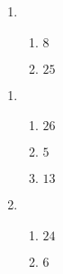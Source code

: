 \documentclass[12pt,twoside]{article}
\makeatletter
\def\emptycleardoublepage{\clearpage\if@twoside \ifodd\c@page\else
\thispagestyle{empty}%
\hbox{}\newpage\if@twocolumn\hbox{}\newpage\fi\fi\fi}
\makeatother
\begin{document}
\begin{multicols}{2}
\begin{enumerate}
\item \begin{enumerate}
\def \a{13}\def \dif{8}\def \b{5}
\item $\dif$
\def \a{8}\def \b{17}\def \apb{25}
\item $\apb$
\def \vshift{-5}\def \hshift{2}\def \chang{2}\def \findval{4}\def \yval{-9}
\end{enumerate}
\end{enumerate}\end{multicols}\emptycleardoublepage{}\graphicspath{{C:/Users/iainc/anaconda3/Randomizer/Sample Course/Sample Assessment 2/}}\begin{multicols}{2} \begin{enumerate}
\item \begin{enumerate}
\def \a{8}\def \b{18}\def \apb{26}
\item $\apb$
\def \a{13}\def \dif{5}\def \b{8}
\item $\dif$
\def \a{4}\def \b{9}\def \ab{13}
\item $\ab$
\def \vshift{-3}\def \hshift{2}\def \chang{1}\def \findval{3}\def \yval{-5}
\end{enumerate}

\item \begin{enumerate}
\def \a{9}\def \b{15}\def \apb{24}
\item $\apb$
\def \a{10}\def \dif{6}\def \b{4}
\item $\dif$
\def \vshift{-5}\def \hshift{-4}\def \chang{-2}\def \findval{-6}\def \yval{-1}
\end{enumerate}
\end{enumerate}\end{multicols}\emptycleardoublepage 
\end{document}
